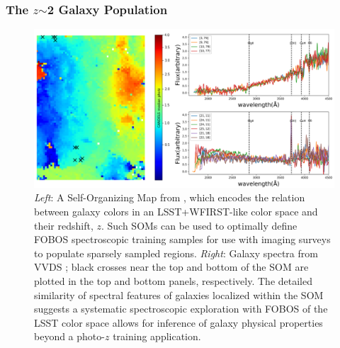 

\subsubsection{The $z$$\sim$2 Galaxy Population}

\begin{figure}[h!]
\vskip -0.1in
\includegraphics[width=\textwidth]{figs/Hemmati18_Fig8_VVDS_spec.png}
\caption{\small {\it Left}: A Self-Organizing Map
\citep[SOM;][]{1990Natur.346...24K} from \citet{hemmati18}, which
encodes the relation between galaxy colors in an LSST+WFIRST-like
color space and their redshift, $z$. Such SOMs can be used to
optimally define FOBOS spectroscopic training samples for use with
imaging surveys to populate sparsely sampled regions. {\it Right}:
Galaxy spectra from VVDS \citep{2005A&A...439..845L}; black crosses
near the top and bottom of the SOM are plotted in the top and bottom
panels, respectively. The detailed similarity of spectral features of
galaxies localized within the SOM suggests a systematic spectroscopic
exploration with FOBOS of the LSST color space allows for inference
of galaxy physical properties beyond a photo-$z$ training
application.}
\label{fig:SOM}
\end{figure}


